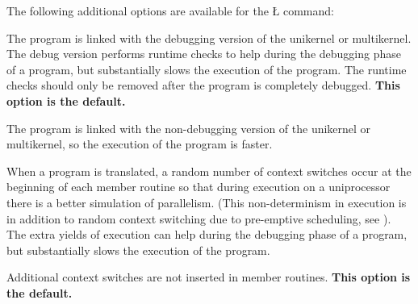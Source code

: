 \documentclass[openright,twoside]{report}
\begin{document}
The following additional options are available for the \LGinlinetrue\LGbegin\lgrinde\L{}\endlgrinde\LGend{} command:
\begin{prefix}
\item[\LGinlinetrue\LGbegin\lgrinde\L{\LB{\-\V{debug}}}\endlgrinde\LGend{}]
%
The program is linked with the debugging version of the unikernel or multikernel.
The debug version performs runtime checks to help during the debugging phase of a \uC program, but substantially slows the execution of the program.
The runtime checks should only be removed after the program is completely debugged.
\textbf{This option is the default.}

\item[\LGinlinetrue\LGbegin\lgrinde\L{\LB{\-\V{nodebug}}}\endlgrinde\LGend{}]
%
The program is linked with the non-debugging version of the unikernel or multikernel, so the execution of the program is faster.

\item[\LGinlinetrue\LGbegin\lgrinde\L{\LB{\-\V{yield}}}\endlgrinde\LGend{}]
%
When a program is translated, a random number of context switches occur at the beginning of each member routine so that during execution on a uniprocessor there is a better simulation of parallelism.
(This non-determinism in execution is in addition to random context switching due to pre-emptive scheduling, see ).
The extra yields of execution can help during the debugging phase of a \uC program, but substantially slows the execution of the program.

\item[\LGinlinetrue\LGbegin\lgrinde\L{\LB{\-\V{noyield}}}\endlgrinde\LGend{}]
%
Additional context switches are not inserted in member routines.
\textbf{This option is the default.}


\end{prefix}
\end{document}
